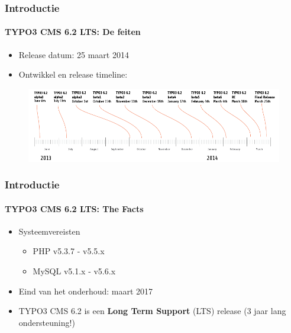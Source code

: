 \begin{frame}[fragile]
	\frametitle{Introductie}
	\framesubtitle{TYPO3 CMS 6.2 LTS: De feiten}

	\begin{itemize}
		\item Release datum: 25 maart 2014
		\item Ontwikkel en release timeline:
	\end{itemize}

	\begin{figure}
		\includegraphics[width=0.99\linewidth]{Images/Introduction/ReleaseTimeline.png}
	\end{figure}

\end{frame}


\begin{frame}[fragile]
	\frametitle{Introductie}
	\framesubtitle{TYPO3 CMS 6.2 LTS: The Facts}

	\begin{itemize}
		\item Systeemvereisten 
		\begin{itemize}
			\item PHP	\tabto{1.2cm} v5.3.7 - v5.5.x
			\item MySQL	\tabto{1.2cm} v5.1.x - v5.6.x
		\end{itemize}
	\end{itemize}

	\begin{itemize}
		\item Eind van het onderhoud: maart 2017
		\item TYPO3 CMS 6.2 is een \textbf{Long Term Support} (LTS) release (3 jaar lang ondersteuning!)
	\end{itemize}

\end{frame}

